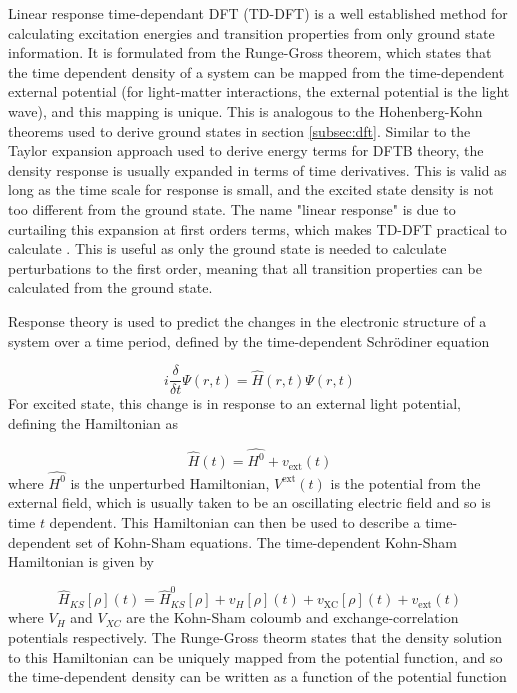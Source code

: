 Linear response time-dependant DFT (TD-DFT) is a well established method for calculating
excitation energies and transition properties from only ground state information. 
It is formulated from the Runge-Gross theorem\cite{Runge1984}, which states that the
time dependent density of a system can be mapped from the time-dependent external 
potential (for light-matter interactions, the external potential is the light wave), 
and this mapping is unique. This is analogous to the Hohenberg-Kohn theorems used
to derive ground states in section \ref{subsec:dft}. Similar to the Taylor expansion
approach used to derive energy terms for DFTB theory, the density response is usually
expanded in terms of time derivatives. This is valid as long as the time scale for 
response is small, and the excited state density is not too different from the ground
state. The name "linear response" is due to curtailing this expansion at first orders 
terms, which makes TD-DFT practical to calculate \cite{Marques2004}. This is useful
as only the ground state is needed to calculate perturbations to the first order, 
meaning that all transition properties can be calculated from the ground state\cite{Marques2004}.

Response theory is used to predict the changes in the electronic structure of a 
system over a time period, defined by the time-dependent Schrödiner equation

\begin{equation}
    i \frac{\delta}{\delta t} \Psi\left(r, t\right) = \hat{H}\left(r, t\right) \Psi\left(r, t\right)
\end{equation}
%
For excited state, this change is in response to an external light potential, defining
the Hamiltonian as

\begin{equation}
\hat{H}\left(t\right) = \hat{H^0} + v_{\text{ext}}\left(t\right)
\end{equation}
%
where $\hat{H^0}$ is the unperturbed Hamiltonian, $V^{\text{ext}}\left(t\right)$ 
is the potential from the external field, which is usually taken to be an oscillating 
electric field and so is time $t$ dependent. This Hamiltonian can then be used to 
describe a time-dependent set of Kohn-Sham equations\cite{Kohn1952}. The time-dependent
Kohn-Sham Hamiltonian is given by

\begin{equation}
\hat{H}_{KS}\left[\rho\right]\left(t\right) = \hat{H}^0_{KS}\left[\rho\right] + v_H\left[\rho\right]\left(t\right) + v_{\text{XC}}\left[\rho\right]\left(t\right) + v_{\text{ext}}\left(t\right)
\end{equation} 
%
where $V_H$ and $V_{XC}$ are the Kohn-Sham coloumb and exchange-correlation potentials 
respectively. The Runge-Gross theorm states that the density solution to this Hamiltonian
can be uniquely mapped from the potential function, and so the time-dependent density 
can be written as a function of the potential function

